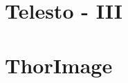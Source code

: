 \section{Telesto - III}
\paragraph{}


\paragraph{}


\section{ThorImage}
\paragraph{}


\paragraph{}


\paragraph{}


\paragraph{}
